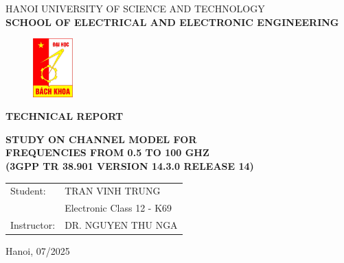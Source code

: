 \cleardoublepage
\thispagestyle{empty}
\begin{center}
\vspace{-12pt}  HANOI UNIVERSITY OF SCIENCE AND TECHNOLOGY \\
\textbf{\fontsize{14pt}{0pt}\selectfont SCHOOL OF ELECTRICAL AND ELECTRONIC ENGINEERING}
\vspace{0.5cm}
 \begin{figure}[H]
     \centering
     \includegraphics[width=1.53cm,height=2.26cm]{Images/logodhbk.png}
 \end{figure}
\vspace{1.5cm}
\vspace{12pt}
\textbf{\fontsize{32pt}{0pt}\selectfont TECHNICAL REPORT}
\vspace{1.5cm}
\end{center}
\begin{center}
    \textbf{\fontsize{20pt}{0pt}\selectfont STUDY ON CHANNEL MODEL FOR}\\
    \vspace{0.25cm}
    \textbf{\fontsize{20pt}{0pt}\selectfont FREQUENCIES FROM 0.5 TO 100 GHZ}\\
    \vspace{0.4cm}
    \textbf{\fontsize{20pt}{0pt}\selectfont (3GPP TR 38.901 VERSION 14.3.0 RELEASE 14)}

\vspace{1.5cm}
\begin{table}[H]
    \centering
    \begin{tabular}{l l}
 \fontsize{14pt}{0pt}\selectfont Student:    & \fontsize{14pt}{0pt}\selectfont TRAN VINH TRUNG \vspace{6pt} \\ 
     & \fontsize{14pt}{0pt}\selectfont Electronic Class 12 - K69 \vspace{6pt}\\
\fontsize{14pt}{0pt}\selectfont Instructor: & \fontsize{14pt}{0pt}\selectfont DR. NGUYEN THU NGA \vspace{6pt}\\
\end{tabular}
\end{table}
\vspace{2.5cm}
 \fontsize{13pt}{0pt}\selectfont Hanoi, 07/2025
\end{center}
\cleardoublepage